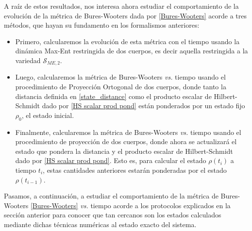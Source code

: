 \documentclass{report} %
\numberwithin{equation}{section}
\begin{document}
A raíz de estos resultados, nos interesa ahora estudiar el comportamiento de la evolución de la métrica de Bures-Wooters dada por \eqref{Bures-Wooters} acorde a tres métodos, que hayan su fundamento en los formalismos anteriores:

\begin{itemize}
    \item Primero, calcularemos la evolución de esta métrica con el tiempo usando la dinámica Max-Ent restringida de dos cuerpos, es decir aquella restringida a la variedad $\mathcal{S}_{ME,2}$.
    \item Luego, calcularemos la métrica de Bures-Wooters \textit{vs.} tiempo usando el procedimiento de Proyección Ortogonal de dos cuerpos, donde tanto la distancia definida en \eqref{state_distance} como el producto escalar de Hilbert-Schmidt dado por \eqref{HS scalar prod pond} están ponderados por un estado fijo $\rho_0$, el estado inicial.
    \item Finalmente, calcularemos la métrica de Bures-Wooters \textit{vs.} tiempo usando el procedimiento de proyección de dos cuerpos, donde ahora se actualizará el estado que pondera la distancia y el producto escalar de Hilbert-Schmidt dado por \eqref{HS scalar prod pond}. Esto es, para calcular el estado $\rho(t_i)$ a tiempo $t_i$, estas cantidades anteriores estarán ponderadas por el estado $\rho(t_{i-1})$. 
\end{itemize}

Pasamos, a continuación, a estudiar el comportamiento de la métrica de Bures-Wooters \eqref{Bures-Wooters} \textit{vs.} tiempo acorde a los protocolos explicados en la sección anterior para conocer que tan cercanos son los estados calculados mediante dichas técnicas numéricas al estado exacto del sistema. 
\end{document}
